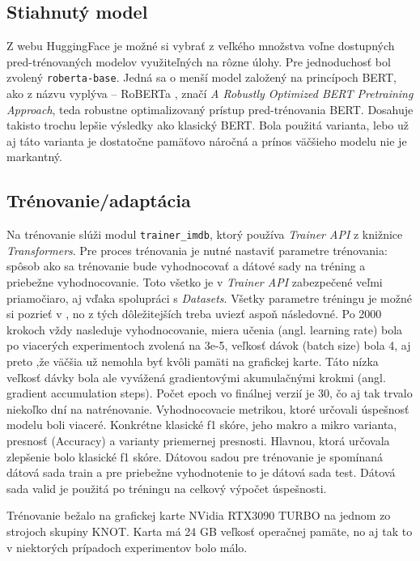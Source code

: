 \subsection*{Stiahnutý model}

Z webu HuggingFace je možné si vybrať z veľkého množstva voľne dostupných pred-trénovaných modelov využiteľných na rôzne úlohy. Pre jednoduchosť bol zvolený {\tt roberta-base}. Jedná sa o menší model založený na princípoch BERT, ako z názvu vyplýva -- RoBERTa \cite{Liu:2019}, značí \textit{A Robustly Optimized BERT Pretraining Approach}, teda robustne optimalizovaný prístup pred-trénovania BERT. Dosahuje takisto trochu lepšie výsledky ako klasický BERT. Bola použitá  varianta, lebo už aj táto varianta je dostatočne pamäťovo náročná a prínos väčšieho modelu nie je markantný.

\subsection*{Trénovanie/adaptácia}

Na trénovanie slúži modul {\tt trainer\_imdb}, ktorý používa \textit{Trainer API} z knižnice \textit{Transformers}. Pre proces trénovania je nutné nastaviť parametre trénovania: spôsob ako sa trénovanie bude vyhodnocovať a dátové sady na tréning a priebežne vyhodnocovanie. Toto všetko je v \textit{Trainer API} zabezpečené veľmi priamočiaro, aj vďaka spolupráci s \textit{Datasets}. Všetky parametre tréningu je možné si pozrieť v , no z tých dôležitejších treba uviezť aspoň následovné. Po 2000 krokoch vždy nasleduje vyhodnocovanie, miera učenia (angl. learning rate) bola po viacerých experimentoch zvolená na 3e-5, veľkosť dávok (batch size) bola 4, aj preto ,že väčšia už nemohla byť kvôli pamäti na grafickej karte. Táto nízka veľkosť dávky bola ale vyvážená gradientovými akumulačnými krokmi (angl. gradient accumulation steps). Počet epoch vo finálnej verzií je 30, čo aj tak trvalo niekoľko dní na natrénovanie. Vyhodnocovacie metrikou, ktoré určovali úspešnosť modelu boli viaceré. Konkrétne klasické f1 skóre, jeho makro a mikro varianta, presnosť (Accuracy) a varianty priemernej presnosti. Hlavnou, ktorá určovala zlepšenie bolo klasické f1 skóre. Dátovou sadou pre trénovanie je spomínaná dátová sada train a pre priebežne vyhodnotenie to je dátová sada test. Dátová sada valid je použitá po tréningu na celkový výpočet úspešnosti. 

Trénovanie bežalo na grafickej karte NVidia RTX3090 TURBO na jednom zo strojoch skupiny KNOT. Karta má 24 GB veľkosť operačnej pamäte, no aj tak to v niektorých prípadoch experimentov bolo málo. 

